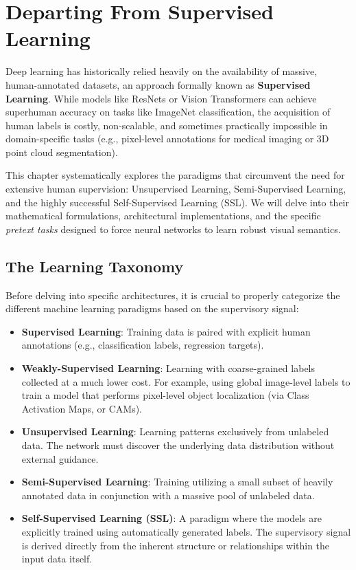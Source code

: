 \chapter{Departing From Supervised Learning}
\label{ch:self_supervised}

Deep learning has historically relied heavily on the availability of massive, human-annotated datasets, an approach formally known as \textbf{Supervised Learning}. While models like ResNets or Vision Transformers can achieve superhuman accuracy on tasks like ImageNet classification, the acquisition of human labels is costly, non-scalable, and sometimes practically impossible in domain-specific tasks (e.g., pixel-level annotations for medical imaging or 3D point cloud segmentation). 

This chapter systematically explores the paradigms that circumvent the need for extensive human supervision: Unsupervised Learning, Semi-Supervised Learning, and the highly successful Self-Supervised Learning (SSL). We will delve into their mathematical formulations, architectural implementations, and the specific \textit{pretext tasks} designed to force neural networks to learn robust visual semantics.

\section{The Learning Taxonomy}
Before delving into specific architectures, it is crucial to properly categorize the different machine learning paradigms based on the supervisory signal:
\begin{itemize}
    \item \textbf{Supervised Learning}: Training data is paired with explicit human annotations (e.g., classification labels, regression targets).
    \item \textbf{Weakly-Supervised Learning}: Learning with coarse-grained labels collected at a much lower cost. For example, using global image-level labels to train a model that performs pixel-level object localization (via Class Activation Maps, or CAMs).
    \item \textbf{Unsupervised Learning}: Learning patterns exclusively from unlabeled data. The network must discover the underlying data distribution without external guidance.
    \item \textbf{Semi-Supervised Learning}: Training utilizing a small subset of heavily annotated data in conjunction with a massive pool of unlabeled data.
    \item \textbf{Self-Supervised Learning (SSL)}: A paradigm where the models are explicitly trained using automatically generated labels. The supervisory signal is derived directly from the inherent structure or relationships within the input data itself.
\end{itemize}

